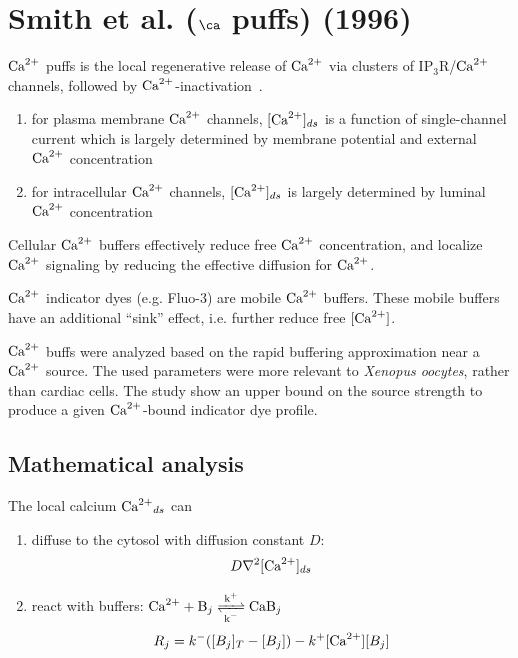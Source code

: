 \section{Smith et al. ($\ca$ puffs) (1996)}
\label{sec:smith-et-al-1}

${\text{Ca}^{2+}}$ puffs is the local regenerative release of ${\text{Ca}^{2+}}$ via clusters of
IP$_3$R/${\text{Ca}^{2+}}$ channels, followed by
${\text{Ca}^{2+}}$-inactivation~\citep{smith1996}.
\begin{enumerate}
\item for plasma membrane ${\text{Ca}^{2+}}$ channels, $[{\text{Ca}^{2+}}]_{ds}$ is a function
  of single-channel current which is largely determined by membrane
  potential and external ${\text{Ca}^{2+}}$ concentration~\citep{}

\item for intracellular ${\text{Ca}^{2+}}$ channels, $[{\text{Ca}^{2+}}]_{ds}$ is largely
  determined by luminal ${\text{Ca}^{2+}}$ concentration~\citep{}
\end{enumerate}

Cellular ${\text{Ca}^{2+}}$ buffers effectively reduce free ${\text{Ca}^{2+}}$ concentration,
and localize ${\text{Ca}^{2+}}$ signaling by reducing the effective diffusion for
${\text{Ca}^{2+}}$. 

${\text{Ca}^{2+}}$ indicator dyes (e.g. Fluo-3) are mobile ${\text{Ca}^{2+}}$ buffers. These
mobile buffers have an additional ``sink'' effect, i.e. further reduce
free $[{\text{Ca}^{2+}}]$. 


${\text{Ca}^{2+}}$ buffs were analyzed based on the rapid buffering approximation
near a ${\text{Ca}^{2+}}$ source. The used parameters were more relevant to {\it
  Xenopus oocytes}, rather than cardiac cells. The study show an upper
bound on the source strength to produce a given ${\text{Ca}^{2+}}$-bound indicator
dye profile.

\subsection{Mathematical analysis}
\label{sec:math-analys}

The local calcium ${\text{Ca}^{2+}}_{ds}$ can 
\begin{enumerate}
\item diffuse to the cytosol with diffusion constant $D$: 
  \begin{equation*}
    D\nabla^2[{\text{Ca}^{2+}}]_{ds}
  \end{equation*}
\item react with buffers: $\ce{Ca^2+ + B_j <=>[k^+][k^-] CaB_j}$
  \begin{equation*}
    R_j = k^-([B_j]_T-[B_j])-k^+[{\text{Ca}^{2+}}][B_j]
  \end{equation*}

\end{enumerate}

